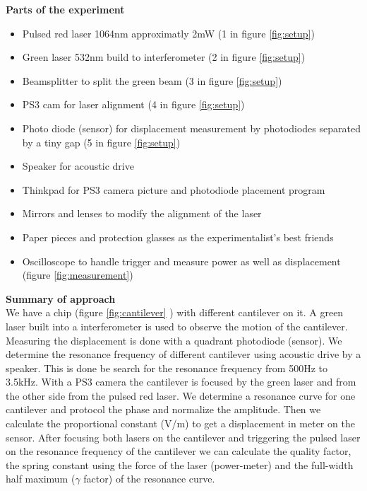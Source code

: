 \documentclass[12pt,a4paper]{article}
\begin{document}
\textbf{Parts of the experiment}
\begin{itemize} %
	\item Pulsed red laser 1064nm approximatly 2mW (1 in figure \ref{fig:setup})
	\item Green laser 532nm build to interferometer (2 in figure \ref{fig:setup})
	\item Beamsplitter to split the green beam (3 in figure \ref{fig:setup})
	\item PS3 cam for laser alignment (4 in figure \ref{fig:setup})
	\item Photo diode (sensor) for displacement measurement by photodiodes separated by a tiny gap (5 in figure \ref{fig:setup})
	\item Speaker for acoustic drive 
	\item Thinkpad for PS3 camera picture and photodiode placement program
	\item Mirrors and lenses to modify the alignment of the laser
	\item Paper pieces and protection glasses as the experimentalist's best friends
	\item Oscilloscope to handle trigger and measure power as well as displacement (figure \ref{fig:measurement})
\end{itemize}

\textbf{Summary of approach}\\ %
We have a chip (figure \ref{fig:cantilever} ) with different cantilever on it. A green laser built into a interferometer is used to observe the motion of the cantilever. Measuring the displacement is done with a quadrant photodiode (sensor). We determine the resonance frequency of different cantilever using acoustic drive by a speaker. This is done be search for the resonance frequency from 500Hz to 3.5kHz. With a PS3 camera the cantilever is focused by the green laser and from the other side from the pulsed red laser. We determine a resonance curve for one cantilever and protocol the phase and normalize the amplitude. Then we calculate the proportional constant (V/m) to get a displacement in meter on the sensor. After focusing both lasers on the cantilever and triggering the pulsed laser on the resonance frequency of the cantilever we can calculate the quality factor, the spring constant using the force of the laser (power-meter) and the full-width half maximum ($\gamma$ factor) of the resonance curve.
\end{document}
